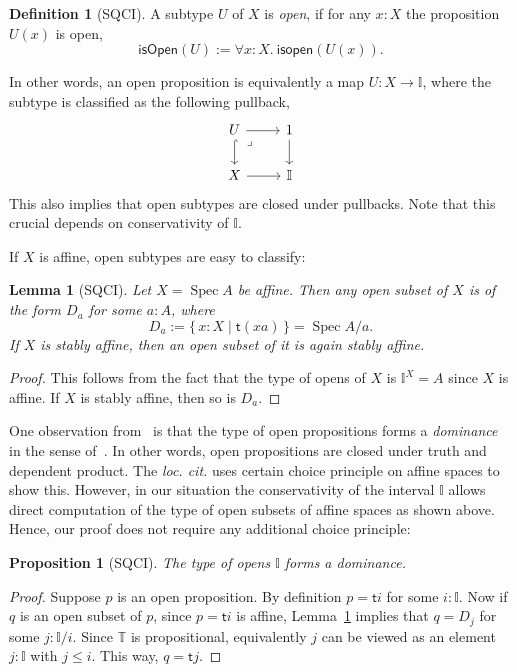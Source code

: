 \documentclass[12pt]{amsart}
\newtheorem{lemma}[theorem]{Lemma}
\newtheorem{proposition}[theorem]{Proposition}
\theoremstyle{definition}
\newtheorem{definition}[theorem]{Definition}
\newcommand{\mbb}[1]{\mathbb{#1}}
\newcommand{\T}{\mbb T}
\newcommand{\I}{\mbb I}
\newcommand{\ms}[1]{\mathsf{#1}}
\newcommand{\scomp}[2]{\{\,#1\mid#2\,\}}
\newcommand{\fa}[2]{\forall #1\!\colon\!\!#2.\ }
\newcommand{\spec}{\operatorname{Spec}}
\begin{document}
\begin{definition}[SQCI]
  A subtype $U$ of $X$ is \emph{open}, if for any $x:X$ the proposition $U(x)$ is open,
  \[ \ms{isOpen}(U) := \fa xX \ms{isopen}(U(x)). \]
\end{definition}

In other words, an open proposition is equivalently a map $U : X \to \I$, where the subtype is classified as the following pullback,
\[
\begin{tikzcd}
  U \ar[d, hook] \ar[r] & 1 \ar[d] \\ 
  X \ar[r] & \I
  \arrow["\lrcorner"{anchor=center, pos=0.125}, draw=none, from=1-1, to=2-2]
\end{tikzcd}
\]
This also implies that open subtypes are closed under pullbacks. Note that this crucial depends on conservativity of $\I$. 

If $X$ is affine, open subtypes are easy to classify:

\begin{lemma}[SQCI]\label{lem:openofaffinegivesalgebra}
  Let $X = \spec A$ be affine. Then any open subset of $X$ is of the form $D_a$ for some $a:A$, where
  \[ D_a := \scomp{x : X}{\ms t(xa)} = \spec A/a. \]
  If $X$ is stably affine, then an open subset of it is again stably affine.
\end{lemma}
\begin{proof}
  This follows from the fact that the type of opens of $X$ is $\I^X = A$ since $X$ is affine. If $X$ is stably affine, then so is $D_a$.
\end{proof}

One observation from~\cite{Cherubini_Coquand_Hutzler_2024} is that the type of open propositions forms a \emph{dominance} in the sense of~\cite{rosolini1986continuity}. In other words, open propositions are closed under truth and dependent product. The \emph{loc. cit.} uses certain choice principle on affine spaces to show this. However, in our situation the conservativity of the interval $\I$ allows direct computation of the type of open subsets of affine spaces as shown above. Hence, our proof does not require any additional choice principle:

\begin{proposition}[SQCI]\label{prop:Idominance}
  The type of opens $\I$ forms a dominance.
\end{proposition}
\begin{proof}
  Suppose $p$ is an open proposition. By definition $p = \ms ti$ for some $i:\I$. Now if $q$ is an open subset of $p$, since $p = \ms ti$ is affine, Lemma~\ref{lem:openofaffinegivesalgebra} implies that $q = D_j$ for some $j : \I/i$. Since $\T$ is propositional, equivalently $j$ can be viewed as an element $j : \I$ with $j \le i$. This way, $q = \ms tj$.
\end{proof}
\end{document}
